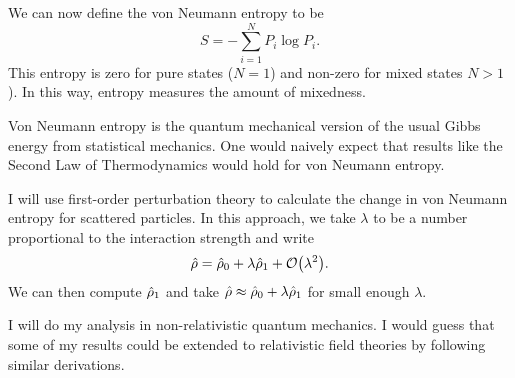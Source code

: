 We can now define the von Neumann entropy to be
\[S = -\sum_{i=1}^N P_i \log P_i.\]
This entropy is zero for pure states (\(N=1\)) and non-zero for mixed states \(N>1\)). In this way, entropy measures the amount of mixedness.

Von Neumann entropy is the quantum mechanical version of the usual Gibbs energy from statistical mechanics. One would naively expect that results like the Second Law of Thermodynamics would hold for von Neumann entropy.

I will use first-order perturbation theory to calculate the change in von Neumann entropy for scattered particles. In this approach, we take \(\lambda\) to be a number proportional to the interaction strength and write
\[\hat{\rho} = \hat{\rho}_0 + \lambda \hat{\rho}_1 + \mathcal{O}{\left(\lambda^2\right)}.\] We can then compute \(\hat{\rho}_1\) and take \(\hat{\rho} \approx \hat{\rho}_0 + \lambda \hat{\rho}_1\) for small enough \(\lambda\).

I will do my analysis in non-relativistic quantum mechanics. I would guess that some of my results could be extended to relativistic field theories by following similar derivations.


